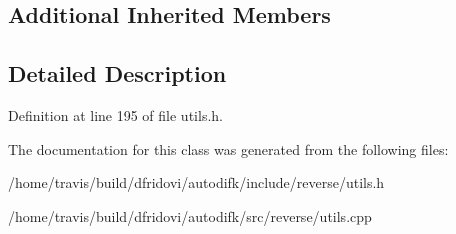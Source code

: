 \subsection*{Additional Inherited Members}


\subsection{Detailed Description}


Definition at line 195 of file utils.\-h.



The documentation for this class was generated from the following files\-:\begin{DoxyCompactItemize}
\item 
/home/travis/build/dfridovi/autodifk/include/reverse/utils.\-h\item 
/home/travis/build/dfridovi/autodifk/src/reverse/utils.\-cpp\end{DoxyCompactItemize}
